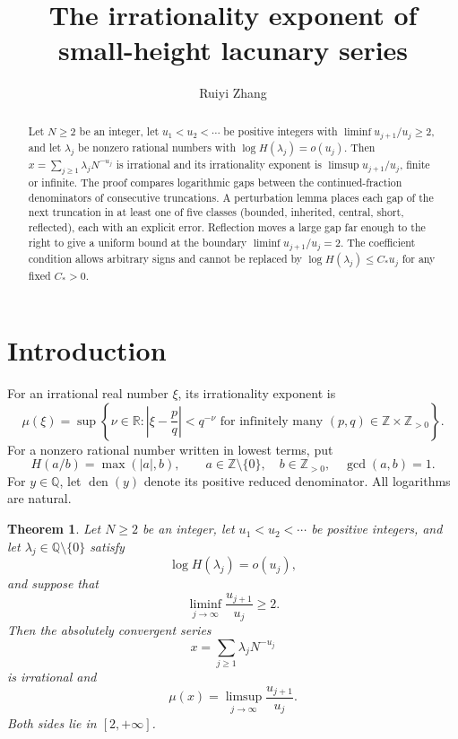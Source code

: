 \documentclass{amsart}
\newtheorem{theorem}{Theorem}
\numberwithin{equation}{section}
\newcommand{\Q}{\mathbb Q}
\newcommand{\Z}{\mathbb Z}
\newcommand{\R}{\mathbb R}
\newcommand{\den}{\operatorname{den}}
\begin{document}
\title[Small-height lacunary series]{The irrationality exponent of small-height lacunary series}
\author{Ruiyi Zhang}
\address{Independent Researcher, Columbia, Maryland, USA}

\begin{abstract}
Let $N\ge2$ be an integer, let $u_1<u_2<\cdots$ be positive
integers with $\liminf u_{j+1}/u_j\ge2$, and let $\lambda_j$ be
nonzero rational numbers with $\log H(\lambda_j)=o(u_j)$.
Then $x=\sum_{j\ge1}\lambda_jN^{-u_j}$ is irrational and its
irrationality exponent is $\limsup u_{j+1}/u_j$, finite or infinite.
The proof compares logarithmic gaps between the continued-fraction
denominators of consecutive truncations. A perturbation lemma places
each gap of the next truncation in at least one of five classes (bounded,
inherited, central, short, reflected), each with an explicit error. Reflection
moves a large gap far enough to the right to give a uniform bound at
the boundary $\liminf u_{j+1}/u_j=2$.
The coefficient condition allows arbitrary signs and cannot be
replaced by $\log H(\lambda_j)\le C_*u_j$ for any fixed $C_*>0$.
\end{abstract}

\maketitle

\section{Introduction}

For an irrational real number $\xi$, its irrationality exponent is
\[
\mu(\xi)=\sup\left\{\nu\in\R:
\left|\xi-\frac pq\right|<q^{-\nu}
\text{ for infinitely many }(p,q)\in\Z\times\Z_{>0}\right\}.
\]
For a nonzero rational number written in lowest terms, put
\begin{equation}\label{eq:height}
H(a/b)=\max(|a|,b),\qquad a\in\Z\setminus\{0\},\quad
b\in\Z_{>0},\quad \gcd(a,b)=1.
\end{equation}
For $y\in\Q$, let $\den(y)$ denote its positive reduced denominator.
All logarithms are natural.

\begin{theorem}\label{thm:main}
Let $N\ge2$ be an integer, let $u_1<u_2<\cdots$ be positive
integers, and let $\lambda_j\in\Q\setminus\{0\}$ satisfy
\[
\log H(\lambda_j)=o(u_j),
\]
and suppose that
\[
\liminf_{j\to\infty}\frac{u_{j+1}}{u_j}\ge2.
\]
Then the absolutely convergent series
\[
x=\sum_{j\ge1}\lambda_jN^{-u_j}
\]
is irrational and
\begin{equation}\label{eq:main}
\mu(x)=\limsup_{j\to\infty}\frac{u_{j+1}}{u_j}.
\end{equation}
Both sides lie in $[2,+\infty]$.
\end{theorem}
\end{document}

